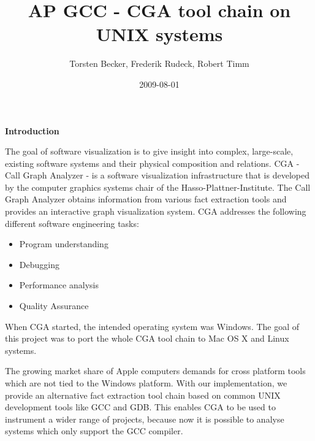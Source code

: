 \documentclass[a4paper,11pt]{article}
\title{AP GCC - CGA tool chain on UNIX systems}
\author{ Torsten Becker, Frederik Rudeck, Robert Timm }
\date{2009-08-01}
\begin{document}
\lstset{language=C++}

\ifpdf {} \else {} \fi

\maketitle

\begin{large}
\textbf{Introduction}\\	
\end{large}

The goal of software visualization is to give insight into complex, large-scale, existing software systems and their physical composition and relations. CGA - Call Graph Analyzer - is a software visualization infrastructure that is developed by the computer graphics systems chair of the Hasso-Plattner-Institute. The Call Graph Analyzer obtains information from various fact extraction tools and provides an interactive graph visualization system. CGA addresses the following different software engineering tasks:

\begin{itemize}
	\item Program understanding
	\item Debugging
	\item Performance analysis
	\item Quality Assurance
\end{itemize}

When CGA started, the intended operating system was Windows. The goal of this project was to port the whole CGA tool chain to Mac OS X and Linux systems. 

The growing market share of Apple computers demands for cross platform tools which are not tied to the Windows platform. With our implementation, we provide an alternative fact extraction tool chain based on common UNIX development tools like GCC and GDB. This enables CGA to be used to instrument a wider range of projects, because now it is possible to analyse systems which only support the GCC compiler. 
\newpage

\tableofcontents
\newpage


\setlength{\parskip}{0.27cm}


 

\newpage
\end{document}
